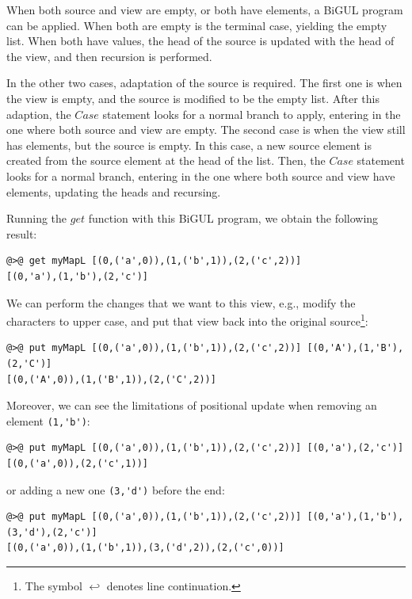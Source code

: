 \documentclass[preprint,numbers]{sigplanconf}
\newcommand{\Conid}[1]{\mathit{#1}}
\newcommand{\Varid}[1]{\mathit{#1}}
\newcommand{\lstcontinueline}{\ensuremath{\hookleftarrow}}
\begin{document}

When both source and view are empty, or both have elements, a BiGUL program can
be applied. When both are empty is the terminal case, yielding the empty list.
When both have values, the head of the source is updated with the head of the
view, and then recursion is performed.

In the other two cases, adaptation of the source is required. The first one is
when the view is empty, and the source is modified to be the empty list. After
this adaption, the \ensuremath{\Conid{Case}} statement looks for a normal branch to apply, entering
in the one where both source and view are empty. The second case is when the
view still has elements, but the source is empty. In this case, a new source
element is created from the source element at the head of the list. Then, the
\ensuremath{\Conid{Case}} statement looks for a normal branch, entering in the one where both
source and view have elements, updating the heads and recursing.

Running the \ensuremath{\Varid{get}} function with this BiGUL program, we obtain the following
result:
%
\begin{lstlisting}
@>@ get myMapL [(0,('a',0)),(1,('b',1)),(2,('c',2))]
[(0,'a'),(1,'b'),(2,'c')]
\end{lstlisting}
%
We can perform the changes that we want to this view, e.g., modify the characters
to upper case, and put that view back into the original source\footnote{The
symbol \lstcontinueline{} denotes line continuation.}:
%
\begin{lstlisting}
@>@ put myMapL [(0,('a',0)),(1,('b',1)),(2,('c',2))] [(0,'A'),(1,'B'),(2,'C')]
[(0,('A',0)),(1,('B',1)),(2,('C',2))]
\end{lstlisting}
%
Moreover, we can see the limitations of positional update when removing an
element \lstinline!(1,'b')!:
%
\begin{lstlisting}
@>@ put myMapL [(0,('a',0)),(1,('b',1)),(2,('c',2))] [(0,'a'),(2,'c')]
[(0,('a',0)),(2,('c',1))]
\end{lstlisting}
%
or adding a new one \lstinline!(3,'d')! before the end:
%
\begin{lstlisting}
@>@ put myMapL [(0,('a',0)),(1,('b',1)),(2,('c',2))] [(0,'a'),(1,'b'),(3,'d'),(2,'c')]
[(0,('a',0)),(1,('b',1)),(3,('d',2)),(2,('c',0))]
\end{lstlisting}
\end{document}
